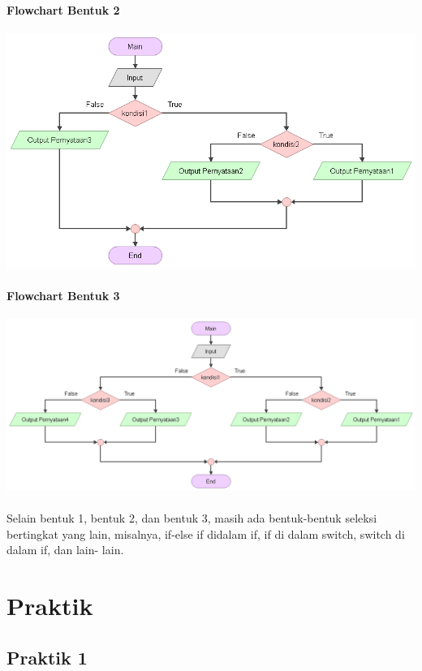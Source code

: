 \documentclass[a4paper,12pt]{article}
\begin{document}
\paragraph{Flowchart Bentuk 2\\}
\includegraphics[width=\linewidth]{modimage--012}
\paragraph{Flowchart Bentuk 3\\}
\includegraphics[width=\linewidth]{modimage--013}
\paragraph{}
Selain bentuk 1, bentuk 2, dan bentuk 3, masih ada bentuk-bentuk seleksi bertingkat
yang lain, misalnya, if-else if didalam if, if di dalam switch, switch di dalam if, dan lain-
lain.
\section{Praktik}
\subsection{Praktik 1}
\end{document}
